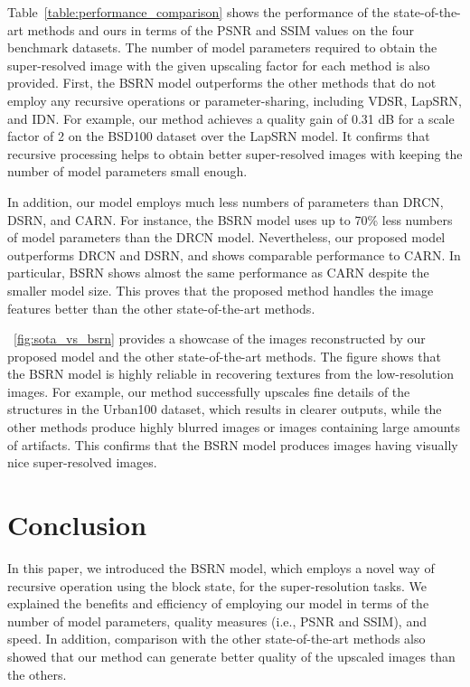 \documentclass[runningheads]{llncs}
\begin{document}
Table~\ref{table:performance_comparison} shows the performance of the state-of-the-art methods and ours in terms of the PSNR and SSIM values on the four benchmark datasets.
The number of model parameters required to obtain the super-resolved image with the given upscaling factor for each method is also provided.
First, the BSRN model outperforms the other methods that do not employ any recursive operations or parameter-sharing, including VDSR, LapSRN, and IDN.
For example, our method achieves a quality gain of 0.31 dB for a scale factor of 2 on the BSD100 dataset over the LapSRN model.
It confirms that recursive processing helps to obtain better super-resolved images with keeping the number of model parameters small enough.

In addition, our model employs much less numbers of parameters than DRCN, DSRN, and CARN.
For instance, the BSRN model uses up to 70\% less numbers of model parameters than the DRCN model.
Nevertheless, our proposed model outperforms DRCN and DSRN, and shows comparable performance to CARN.
In particular, BSRN shows almost the same performance as CARN despite the smaller model size.
This proves that the proposed method handles the image features better than the other state-of-the-art methods.

\figurename~\ref{fig:sota_vs_bsrn} provides a showcase of the images reconstructed by our proposed model and the other state-of-the-art methods.
The figure shows that the BSRN model is highly reliable in recovering textures from the low-resolution images.
For example, our method successfully upscales fine details of the structures in the Urban100 dataset, which results in clearer outputs, while the other methods produce highly blurred images or images containing large amounts of artifacts.
This confirms that the BSRN model produces images having visually nice super-resolved images.


\section{Conclusion}
\label{sec:conclusion}

In this paper, we introduced the BSRN model, which employs a novel way of recursive operation using the block state, for the super-resolution tasks.
We explained the benefits and efficiency of employing our model in terms of the number of model parameters, quality measures (i.e., PSNR and SSIM), and speed.
In addition, comparison with the other state-of-the-art methods also showed that our method can generate better quality of the upscaled images than the others.



\end{document}
